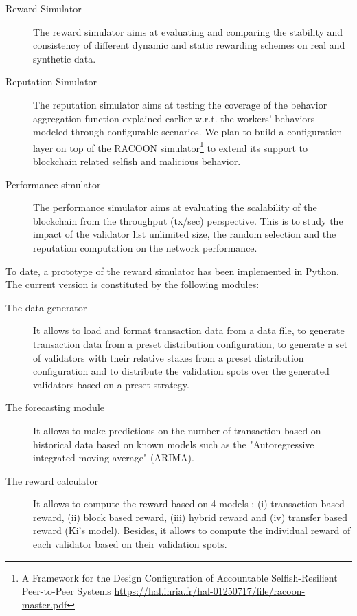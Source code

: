 \begin{description}
	\item[Reward Simulator] The reward simulator aims at evaluating and comparing the stability and consistency of different dynamic and static rewarding schemes on real and synthetic data.
	\item[Reputation Simulator] The reputation simulator aims at testing the coverage of the behavior aggregation function explained earlier w.r.t. the workers' behaviors modeled through configurable scenarios. We plan to build a configuration layer on top of the RACOON simulator\footnote{A Framework for the Design Configuration of Accountable Selfish-Resilient Peer-to-Peer Systems \url{https://hal.inria.fr/hal-01250717/file/racoon-master.pdf}} to extend its support to blockchain related selfish and malicious behavior.
	\item[Performance simulator] The performance simulator aims at evaluating the scalability of the blockchain from the throughput (tx/sec) perspective. This is to study the impact of the validator list unlimited size, the random selection and the reputation computation on the network performance.
\end{description}
 
To date, a prototype of the reward simulator has been implemented in Python. The current version is constituted by the following modules: 
\begin{description}
	\item[The data generator] It allows to load and format transaction data from a data file, to generate transaction data from a preset distribution configuration, to generate a set of validators with their relative stakes from a preset distribution configuration and to distribute the validation spots over the generated validators based on a preset strategy.
	\item[The forecasting module] It allows to make predictions on the number of transaction based on historical data based on known models such as the "Autoregressive integrated moving average" (ARIMA).
	\item[The reward calculator] It allows to compute the reward based on 4 models : (i) transaction based reward, (ii) block based reward, (iii) hybrid reward and (iv) transfer based reward (Ki's model). Besides, it allows to compute the individual reward of each validator based on their validation spots.
\end{description}


